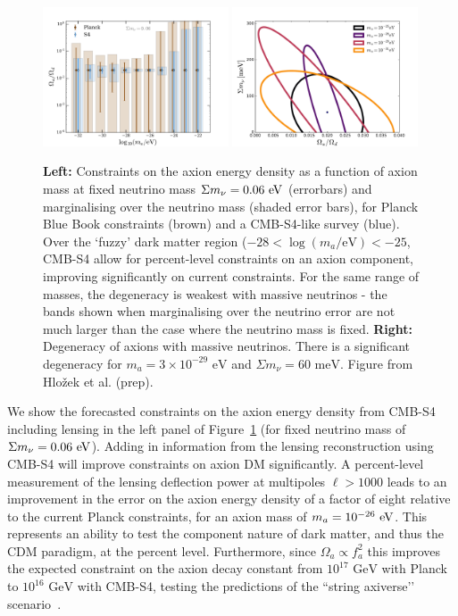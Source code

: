\begin{figure}[t] 
\begin{center} 
\includegraphics[width=0.49\textwidth]{DarkEnergy/Log_constraints_axions_s4.pdf}
\includegraphics[width=0.49\textwidth]{DarkEnergy/s4_frac_omnuh2.pdf}
\caption{\textbf{Left:} Constraints on the axion energy density as a function of axion mass at fixed neutrino mass $\Sigma m_\nu = 0.06~\rm{eV}$ (errorbars) and marginalising over the neutrino mass (shaded error bars), for Planck Blue Book constraints (brown) and a CMB-S4-like survey (blue). Over the `fuzzy' dark matter region ($-28 < \log(m_a/\mathrm{eV}) < -25$, CMB-S4 allow for percent-level constraints on an axion component, improving significantly on current constraints. For the same range of masses, the degeneracy is weakest with massive neutrinos - the bands shown when marginalising over the neutrino error are not much larger than the case where the neutrino mass is fixed. \textbf{Right:} Degeneracy of axions with massive neutrinos. There is a significant degeneracy for $m_a=3\times 10^{-29}\text{ eV}$ and $\Sigma m_\nu=60\text{ meV}$. Figure from Hlo\v{z}ek et al. (prep).
\label{fig:axions}}
\end{center}       
\end{figure}       

We show the forecasted constraints on the axion energy density from CMB-S4 including lensing in the left panel of Figure~\ref{fig:axions} (for fixed neutrino mass of $\Sigma m_\nu = 0.06~\rm{eV}$). Adding in information from the lensing reconstruction using CMB-S4 will improve constraints on axion DM significantly. A percent-level measurement of the lensing deflection power at multipoles $\ell > 1000$ leads to an improvement in the error on the axion energy density of a factor of eight relative to the current Planck constraints, for an axion mass of $m_a=10^{-26}~{\rm eV}$.    This represents an ability to test the component nature of dark matter, and thus the CDM paradigm, at the percent level. Furthermore, since $\Omega_a\propto f_a^2$ this improves the expected constraint on the axion decay constant from $10^{17}\text{ GeV}$ with Planck to $10^{16}\text{ GeV}$ with CMB-S4, testing the predictions of the ``string axiverse’’ scenario~\cite{Arvanitaki:2009fg}. 

